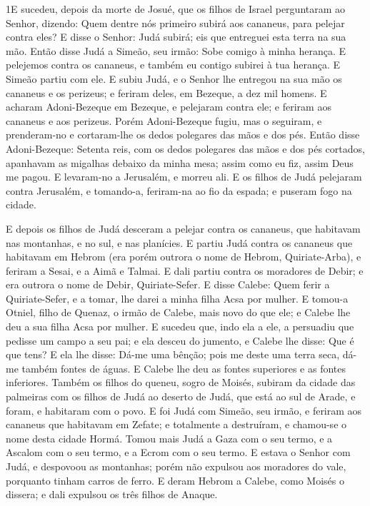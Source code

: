 
\lettrine{1} E sucedeu, depois da morte de Josué, que os
filhos de Israel perguntaram ao Senhor, dizendo: Quem dentre nós
primeiro subirá aos cananeus, para pelejar contra eles? E disse
o Senhor: Judá subirá; eis que entreguei esta terra na sua mão.
Então disse Judá a Simeão, seu irmão: Sobe comigo à minha
herança. E pelejemos contra os cananeus, e também eu contigo subirei
à tua herança. E Simeão partiu com ele. E subiu Judá, e o Senhor
lhe entregou na sua mão os cananeus e os perizeus; e feriram deles,
em Bezeque, a dez mil homens. E acharam Adoni-Bezeque em
Bezeque, e pelejaram contra ele; e feriram aos cananeus e aos
perizeus. Porém Adoni-Bezeque fugiu, mas o seguiram, e
prenderam-no e cortaram-lhe os dedos polegares das mãos e dos pés.
Então disse Adoni-Bezeque: Setenta reis, com os dedos polegares
das mãos e dos pés cortados, apanhavam as migalhas debaixo da minha
mesa; assim como eu fiz, assim Deus me pagou. E levaram-no a
Jerusalém, e morreu ali. E os filhos de Judá pelejaram contra
Jerusalém, e tomando-a, feriram-na ao fio da espada; e puseram fogo
na cidade.

E depois os filhos de Judá desceram a pelejar contra os cananeus,
que habitavam nas montanhas, e no sul, e nas planícies. E
partiu Judá contra os cananeus que habitavam em Hebrom (era porém
outrora o nome de Hebrom, Quiriate-Arba), e feriram a Sesai, e a
Aimã e Talmai. E dali partiu contra os moradores de Debir; e
era outrora o nome de Debir, Quiriate-Sefer. E disse Calebe:
Quem ferir a Quiriate-Sefer, e a tomar, lhe darei a minha filha Acsa
por mulher. E tomou-a Otniel, filho de Quenaz, o irmão de
Calebe, mais novo do que ele; e Calebe lhe deu a sua filha Acsa por
mulher. E sucedeu que, indo ela a ele, a persuadiu que
pedisse um campo a seu pai; e ela desceu do jumento, e Calebe lhe
disse: Que é que tens? E ela lhe disse: Dá-me uma bênção;
pois me deste uma terra seca, dá-me também fontes de águas. E Calebe
lhe deu as fontes superiores e as fontes inferiores. Também
os filhos do queneu, sogro de Moisés, subiram da cidade das
palmeiras com os filhos de Judá ao deserto de Judá, que está ao sul
de Arade, e foram, e habitaram com o povo. E foi Judá com
Simeão, seu irmão, e feriram aos cananeus que habitavam em Zefate; e
totalmente a destruíram, e chamou-se o nome desta cidade Hormá.
Tomou mais Judá a Gaza com o seu termo, e a Ascalom com o seu
termo, e a Ecrom com o seu termo. E estava o Senhor com Judá,
e despovoou as montanhas; porém não expulsou aos moradores do vale,
porquanto tinham carros de ferro. E deram Hebrom a Calebe,
como Moisés o dissera; e dali expulsou os três filhos de Anaque.

